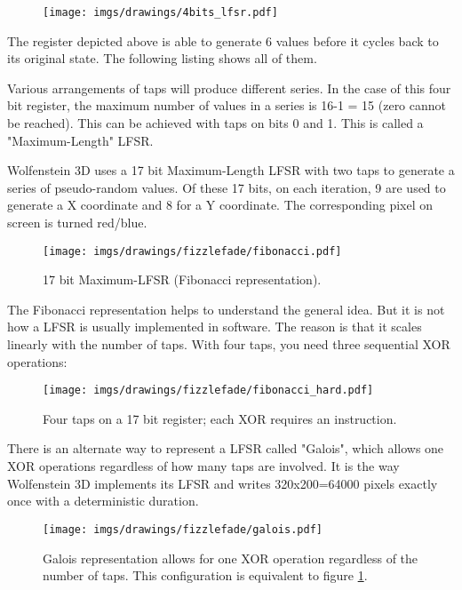 \begin{figure}[H]
 \centering
  \texttt{[image: imgs/drawings/4bits\_lfsr.pdf]}
\end{figure}
The register depicted above is able to generate 6 values before it cycles back to its original state. The following listing shows all of them.\\
\par
\begin{minipage}{\textwidth}

\end{minipage}
\par
Various arrangements of taps will produce different series. In the case of this four bit register, the maximum number of values in a series is 16-1 = 15 (zero cannot be reached). This can be achieved with taps on bits 0 and 1. This is called a "Maximum-Length" LFSR.\\
\par
\begin{minipage}{\textwidth}

\end{minipage}
\par
\par
Wolfenstein 3D  uses a 17 bit Maximum-Length LFSR with two taps to generate a series of pseudo-random values. Of these 17 bits, on each iteration, 9 are used to generate a X coordinate and 8 for a Y coordinate. The corresponding pixel on screen is turned red/blue.\\
\par
\begin{figure}[H] 
   \centering \texttt{[image: imgs/drawings/fizzlefade/fibonacci.pdf]} 
   \caption{17 bit Maximum-LFSR (Fibonacci representation).}
   \label{wolf_lfsr_fibo}
\end{figure}
\par
The Fibonacci representation helps to understand the general idea. But it is not how a LFSR is usually implemented in software. The reason is that it scales linearly with the number of taps. With four taps, you need three sequential XOR operations:
\par
\begin{figure}[H] 
    \centering \texttt{[image: imgs/drawings/fizzlefade/fibonacci\_hard.pdf]} 
    \caption{Four taps on a 17 bit register; each XOR requires an instruction.}
\end{figure}
\par
There is an alternate way to represent a LFSR called "Galois", which allows one XOR operations regardless of how many taps are involved. It is the way Wolfenstein 3D implements its LFSR and writes 320x200=64000 pixels exactly once with a deterministic duration.
\par
\begin{figure}[H] 
    \centering \texttt{[image: imgs/drawings/fizzlefade/galois.pdf]} 
    \caption{Galois representation allows for one XOR operation regardless of the number of taps. This configuration is equivalent to figure \ref{wolf_lfsr_fibo}.}
\end{figure}
      
